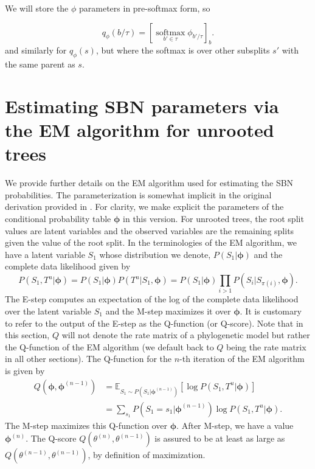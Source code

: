 \documentclass{article}
\newcommand{\E}{\mathbb{E}}
\newcommand{\softmax}{\operatorname*{softmax}}
\begin{document}
We will store the $\phi$ parameters in pre-softmax form, so

\[
    q_\phi(b \slash \tau) = \left[ \softmax_{b' \in \tau} \phi_{b' \slash \tau} \right]_b .
\]
and similarly for $q_\phi(s)$, but where the softmax is over other subsplits $s'$ with the same parent as $s$.


\section*{Estimating SBN parameters via the EM algorithm for unrooted trees}

We provide further details on the EM algorithm used for estimating the SBN probabilities.
The parameterization is somewhat implicit in the original derivation provided in \cite{Zhang2018-mm}.
For clarity, we make explicit the parameters of the conditional probability table $\bm{\phi}$ in this version.
For unrooted trees, the root split values are latent variables and the observed variables are the remaining splits given the value of the root split.
In the terminologies of the EM algorithm, we have a latent variable $S_1$ whose distribution we denote, $P(S_1 | \bm{\phi})$ and the complete data likelihood given by
\begin{equation}
    P(S_1, T^u | \bm{\phi}) = P(S_1 | \bm{\phi}) P(T^u | S_1, \bm{\phi}) = P(S_1 | \bm{\phi}) \prod\limits_{i > 1} P(S_i | S_{\pi(i)}, \bm{\phi}).
\end{equation}
The E-step computes an expectation of the log of the complete data likelihood over the latent variable $S_1$ and the M-step maximizes it over $\bm{\phi}$.
It is customary to refer to the output of the E-step as the Q-function (or Q-score).
Note that in this section, $Q$ will not denote the rate matrix of a phylogenetic model but rather the Q-function of the EM algorithm (we default back to $Q$ being the rate matrix in all other sections).
The Q-function for the $n$-th iteration of the EM algorithm is given by
\begin{align*}
    Q(\bm{\phi}, \bm{\phi}^{(n-1)}) &= \E_{S_1 \sim P(S_1 | \bm{\phi}^{(n-1)})}\left[ \log P(S_1, T^u | \bm{\phi}) \right] \\
    &= \sum\limits_{s_1} P(S_1 = s_1 | \bm{\phi}^{(n-1)}) \log P(S_1, T^u | \bm{\phi}).
\end{align*}
The M-step maximizes this Q-function over $\bm{\phi}$. After M-step, we have a value $\bm{\phi}^{(n)}$.
The Q-score $Q(\theta^{(n)}, \theta^{(n-1)})$ is assured to be at least as large as $Q(\theta^{(n-1)}, \theta^{(n-1)})$, by definition of maximization.
\end{document}
